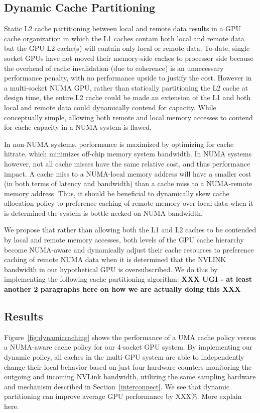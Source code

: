 \subsection{Dynamic Cache Partitioning}

Static L2 cache partitioning between local and remote data results in a GPU cache
organization in which the L1 caches contain both local and remote data but the GPU
L2 cache(s) will contain only local or remote data.  To-date, single socket GPUs
have not moved their memory-side caches to processor side because the overhead of
cache invalidation (due to coherence) is an unnecessary performance penalty, with
no performance upside to justify the cost.  However in a multi-socket NUMA GPU,
rather than statically partitioning the L2 cache at design time, the entire L2 cache
could be made an extension of the L1 and both local and remote data could dynamically
contend for capacity.  While conceptually simple, allowing both remote and local
memory accesses to contend for cache capacity in a NUMA system is flawed.

In non-NUMA systems, performance is maximized by optimizing for cache hitrate, which
minimizes off-chip memory system bandwidth.  In NUMA systems however, not all cache
misses have the same relative cost, and thus performance impact.  A cache miss to a 
NUMA-local memory address will have a smaller cost (in both terms of latency and bandwidth)
than a cache miss to a NUMA-remote memory address.  Thus, it should be beneficial
to dynamically skew cache allocation policy to preference caching of remote memory over local
data when it is determined the system is bottle necked on NUMA bandwidth.

We propose that rather than allowing both the L1 and L2 caches to be contended by local
and remote memory accesses,  both levels of the GPU cache hierarchy become NUMA-aware
and dynamically adjust their cache resources to preference caching of remote NUMA
data when it is determined that the NVLINK bandwidth in our hypothetical GPU is
oversubscribed.  We do this by implementing the following cache partitioning
algorithm:  \textbf{XXX UGI - at least another 2 paragraphs here on how we are actually doing this XXX}

\subsection{Results}

Figure~\ref{fig:dynamiccaching} shows the performance of a UMA cache policy versus
a NUMA-aware cache policy for our 4-socket GPU system.  By implementing our dynamic
policy, all caches in the multi-GPU system are able to independently change their local
behavior based on just four hardware counters monitoring the outgoing and incoming
NVLink bandwidth, utilizing the same sampling hardware and mechanism described in 
Section~\ref{interconnect}.  We see that dynamic partitioning can improve average GPU
performance by XXX\%.  More explain here.

